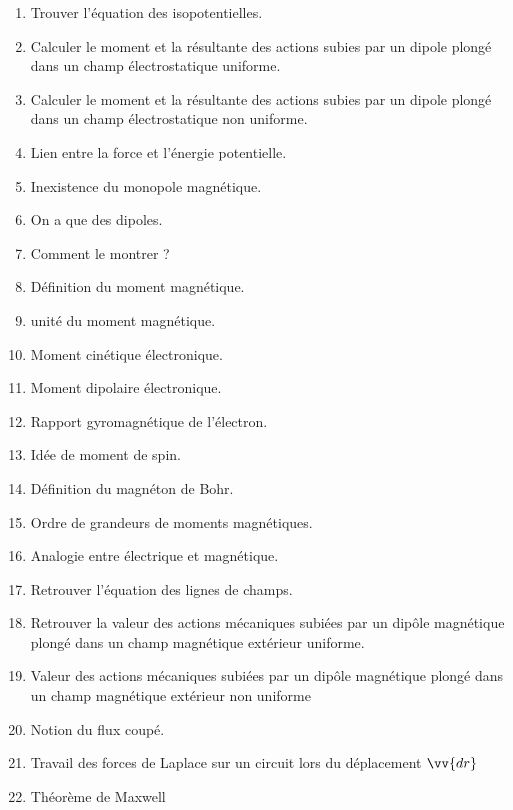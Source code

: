 \documentclass[a4paper, 11pt, hidelinks]{article}
\begin{document}
\begin{enumerate}
    \item Trouver l'équation des isopotentielles. \cite{Chapitre12}
    \item Calculer le moment et la résultante des actions subies par un dipole plongé dans un champ électrostatique uniforme. \cite{Chapitre12}
    \item Calculer le moment et la résultante des actions subies par un dipole plongé dans un champ électrostatique non uniforme. \cite{Chapitre12}
    \item Lien entre la force et l'énergie potentielle. \cite{Chapitre12}
    \item Inexistence du monopole magnétique. \cite{Chapitre12}
    \item On a que des dipoles. \cite{Chapitre12}
    \item Comment le montrer ? \cite{Chapitre12}
    \item Définition du moment magnétique. \cite{Chapitre12}
    \item unité du moment magnétique. \cite{Chapitre12}
    \item Moment cinétique électronique. \cite{Chapitre12}
    \item Moment dipolaire électronique. \cite{Chapitre12}
    \item Rapport gyromagnétique de l'électron. \cite{Chapitre12}
    \item Idée de moment de spin. \cite{Chapitre12}
    \item Définition du magnéton de Bohr. \cite{Chapitre12}
    \item Ordre de grandeurs de moments magnétiques. \cite{Chapitre12}
    \item Analogie entre électrique et magnétique. \cite{Chapitre12}
    \item Retrouver l'équation des lignes de champs. \cite{Chapitre12}
    \item Retrouver la valeur des actions mécaniques subiées par un dipôle magnétique plongé dans un champ magnétique extérieur uniforme. \cite{Chapitre12}
    \item Valeur des actions mécaniques subiées par un dipôle magnétique plongé dans un champ magnétique extérieur non uniforme \cite{Chapitre12}
    \item Notion du flux coupé. \cite{Chapitre12}
    \item Travail des forces de Laplace sur un circuit lors du déplacement $\vv{dr}$ \cite{Chapitre12}
    \item Théorème de Maxwell \cite{Chapitre12}

\end{enumerate}
\end{document}
